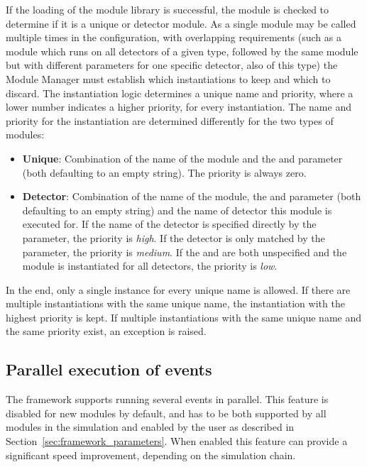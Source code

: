 If the loading of the module library is successful, the module is checked to determine if it is a unique or detector module.
As a single module may be called multiple times in the configuration, with overlapping requirements (such as a module which runs on all detectors of a given type, followed by the same module but with different parameters for one specific detector, also of this type) the Module Manager must establish which instantiations to keep and which to discard.
The instantiation logic determines a unique name and priority, where a lower number indicates a higher priority, for every instantiation.
The name and priority for the instantiation are determined differently for the two types of modules:
\begin{itemize}
\item \textbf{Unique}: Combination of the name of the module and the  and  parameter (both defaulting to an empty string).
The priority is always zero.
\item \textbf{Detector}: Combination of the name of the module, the  and  parameter (both defaulting to an empty string) and the name of detector this module is executed for.
If the name of the detector is specified directly by the  parameter, the priority is \emph{high}.
If the detector is only matched by the  parameter, the priority is \emph{medium}.
If the  and  are both unspecified and the module is instantiated for all detectors, the priority is \emph{low}.
\end{itemize}
In the end, only a single instance for every unique name is allowed.
If there are multiple instantiations with the same unique name, the instantiation with the highest priority is kept.
If multiple instantiations with the same unique name and the same priority exist, an exception is raised.

\subsection{Parallel execution of events}
\label{sec:multithreading}
The framework supports running several events in parallel.
This feature is disabled for new modules by default, and has to be both supported by all modules in the simulation and enabled by the user as described in Section~\ref{sec:framework_parameters}.
When enabled this feature can provide a significant speed improvement, depending on the simulation chain.

